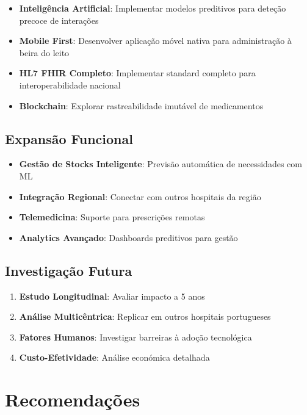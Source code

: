 \begin{itemize}
    \item \textbf{Inteligência Artificial}: Implementar modelos preditivos para deteção precoce de interações \cite{bates2021,zhao2021}
    \item \textbf{Mobile First}: Desenvolver aplicação móvel nativa para administração à beira do leito
    \item \textbf{HL7 FHIR Completo}: Implementar standard completo para interoperabilidade nacional \cite{mandl2020}
    \item \textbf{Blockchain}: Explorar rastreabilidade imutável de medicamentos \cite{franzoso2014}
\end{itemize}

\subsection{Expansão Funcional}

\begin{itemize}
    \item \textbf{Gestão de Stocks Inteligente}: Previsão automática de necessidades com ML \cite{rozenblum2020}
    \item \textbf{Integração Regional}: Conectar com outros hospitais da região
    \item \textbf{Telemedicina}: Suporte para prescrições remotas
    \item \textbf{Analytics Avançado}: Dashboards preditivos para gestão \cite{berwick2008}
\end{itemize}

\subsection{Investigação Futura}

\begin{enumerate}
    \item \textbf{Estudo Longitudinal}: Avaliar impacto a 5 anos \cite{greenhalgh2017}
    \item \textbf{Análise Multicêntrica}: Replicar em outros hospitais portugueses
    \item \textbf{Fatores Humanos}: Investigar barreiras à adoção tecnológica \cite{holden2011}
    \item \textbf{Custo-Efetividade}: Análise económica detalhada \cite{adler2021}
\end{enumerate}

\section{Recomendações}

